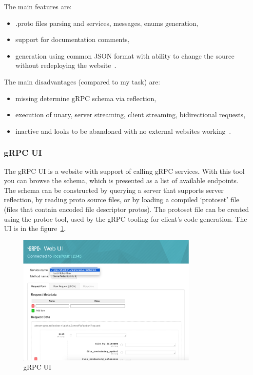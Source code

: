 The main features are:
\begin{itemize}
    \item .proto files parsing and services, messages, enums generation,
    \item support for documentation comments,
    \item generation using common JSON format with ability to change the source without redeploying the website~\cite{grpc-gendocu}.
\end{itemize}

The main disadvantages (compared to my task) are:
\begin{itemize}
    \item missing determine gRPC schema via reflection,
    \item execution of unary, server streaming, client streaming, bidirectional requests,
    \item inactive and looks to be abandoned with no external websites working~\cite{grpc-gendocu}.
\end{itemize}

\subsubsection{gRPC UI}
The gRPC UI is a website with support of calling gRPC services.
With this tool you can browse the schema, which is presented as a list of available endpoints.
The schema can be constructed by querying a server that supports server reflection, by reading proto source files, or by loading a compiled `protoset' file (files that contain encoded file descriptor protos).
The protoset file can be created using the protoc tool, used by the gRPC tooling for client's code generation.
The UI is in the figure~\ref{fig:grpc-grpcui}.
\cite{grpc-grpcui}

\begin{figure}[hbt!]
    \centering
    \captionsetup{justification=centering}
    \includegraphics[width=0.8\textwidth]{images/grpc/grpcui}
    \caption{gRPC UI~\cite{grpc-grpcui}}
    \label{fig:grpc-grpcui}
\end{figure}

